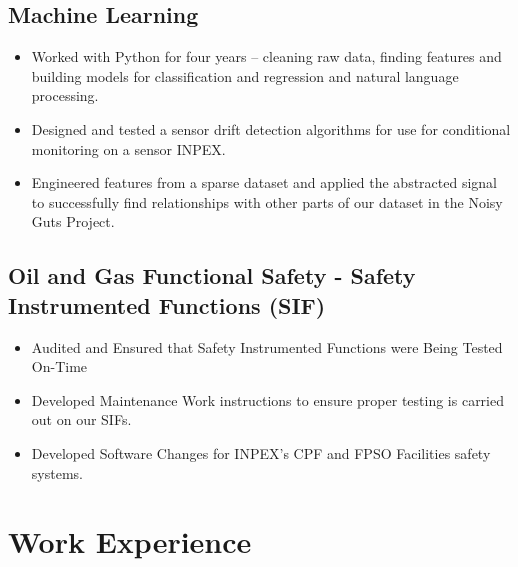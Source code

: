 \documentclass{article}[a4page]
\begin{document}
\subsection*{Machine Learning}
\begin{itemize}
\item Worked with Python for four years – cleaning raw data, finding features and building models for classification and regression and natural language processing.
\item Designed and tested a sensor drift detection algorithms for use for conditional monitoring on a sensor INPEX.
\item Engineered features from a sparse dataset and applied the abstracted signal to successfully find relationships with other parts of our dataset in the Noisy Guts Project.
\end{itemize}

\subsection*{Oil and Gas Functional Safety - Safety Instrumented Functions (SIF)}
\begin{itemize}
\item Audited and Ensured that Safety Instrumented Functions were Being Tested On-Time
\item Developed Maintenance Work instructions to ensure proper testing is carried out on our SIFs.
\item Developed Software Changes for INPEX's CPF and FPSO Facilities safety systems.
\end{itemize}

\section*{Work Experience}
\end{document}
